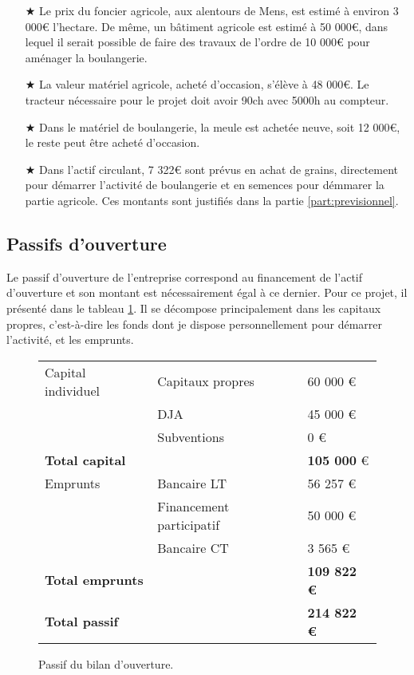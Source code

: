 \documentclass{book}
\begin{document}
\begin{itemize}
	
	\item[$\bigstar$]	Le prix du foncier agricole, aux alentours de Mens, est estimé à environ 3 000\euro{} l'hectare. De même, un bâtiment agricole est estimé à 50 000\euro{}, dans lequel il serait possible de faire des travaux de l'ordre de 10 000\euro{} pour aménager la boulangerie.
	\item[$\bigstar$] La valeur matériel agricole, acheté d'occasion, s'élève à 48 000\euro{}. Le tracteur nécessaire pour le projet doit avoir 90ch avec 5000h au compteur.
	\item[$\bigstar$] Dans le matériel de boulangerie, la meule est achetée neuve, soit 12 000\euro{}, le reste peut être acheté d'occasion.
	\item[$\bigstar$] Dans l'actif circulant, 7 322\euro{} sont prévus en achat de grains, directement pour démarrer l'activité de boulangerie et en semences pour démmarer la partie agricole. Ces montants sont justifiés dans la partie \ref{part:previsionnel}.
\end{itemize}

\subsection{Passifs d'ouverture}
\label{part:passif}

Le passif d'ouverture de l'entreprise correspond au financement de l'actif d'ouverture et son montant est nécessairement égal à ce dernier. Pour ce projet, il présenté dans le tableau \ref{tab:passif}. Il se décompose principalement dans les capitaux propres, c'est-à-dire les fonds dont je dispose personnellement pour démarrer l'activité, et les emprunts.

\begin{figure}[h!]
\footnotesize
\center
\begin{tabular}{ | p{} | p{}| p{2cm}| }

\hline
	Capital individuel & Capitaux propres & 60 000 \euro{}\\ 
	& DJA & 45 000 \euro{}\\ 
	& Subventions & 0 \euro{}\\ \hline
	\textbf{Total capital} & & \textbf{105 000} \euro{}\\ \hline
	 \hline
	Emprunts & Bancaire LT & 56 257 \euro{} \\ 
	& Financement participatif & 50 000 \euro{}\\ 
	& Bancaire CT & 3 565 \euro{}\\ \hline
	\textbf{Total emprunts} & & \textbf{109 822 \euro{}}\\ \hline
	 \hline
	\textbf{Total passif} & &\textbf{214 822 \euro{}}\\ \hline

\end{tabular}
\caption{Passif du bilan d'ouverture.}
\label{tab:passif}
\end{figure}
\end{document}
